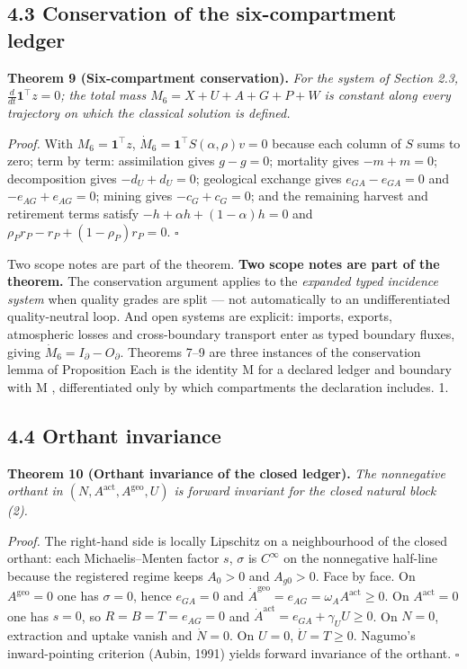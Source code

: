 \documentclass[11pt]{article}
\begin{document}
\subsection*{4.3 Conservation of the six-compartment ledger}\label{43-conservation-of-the-six-compartment-ledger}

\textbf{Theorem 9 (Six-compartment conservation).} \emph{For the system of Section 2.3, \(\frac{d}{dt}\mathbf{1}^\top z =\allowbreak{} 0\); the total mass \(M_6 = X + U + A + G + P + W\) is constant along every trajectory on which the classical solution is defined.}

\emph{Proof.} With \(M_6 = \mathbf{1}^\top z\), \(\dot M_6 =\allowbreak{} \mathbf{1}^\top S(\alpha,\allowbreak{}\rho) v =\allowbreak{} 0\) because each column of \(S\) sums to zero; term by term: assimilation gives \(g - g = 0\); mortality gives \(-m + m = 0\); decomposition gives \(-d_U + d_U = 0\); geological exchange gives \(e_{GA} - e_{GA} = 0\) and \(-e_{AG} + e_{AG} = 0\); mining gives \(-c_G + c_G = 0\); and the remaining harvest and retirement terms satisfy \(-h +\allowbreak{} \alpha h +\allowbreak{} (1-\alpha)h =\allowbreak{} 0\) and \(\rho_P r_P - r_P +\allowbreak{} (1-\rho_P)r_P =\allowbreak{} 0\). \(\square\)

Two scope notes are part of the theorem. \textbf{Two scope notes are part of the theorem.} The conservation argument applies to the \emph{expanded typed incidence system} when quality grades are split --- not automatically to an undifferentiated quality-neutral loop. And open systems are explicit: imports, exports, atmospheric losses and cross-boundary transport enter as typed boundary fluxes, giving \(\dot M_6=\allowbreak{}I_\partial-O_\partial\). Theorems 7--9 are three instances of the conservation lemma of Proposition Each is the identity M for a declared ledger and boundary with M , differentiated only by which compartments the declaration includes. 1.

\subsection*{4.4 Orthant invariance}\label{44-orthant-invariance}

\textbf{Theorem 10 (Orthant invariance of the closed ledger).} \emph{The nonnegative orthant in \((N,\allowbreak{} A^{\mathrm{act}},\allowbreak{} A^{\mathrm{geo}},\allowbreak{} U)\) is forward invariant for the closed natural block (2).}

\emph{Proof.} The right-hand side is locally Lipschitz on a neighbourhood of the closed orthant: each Michaelis--Menten factor \(s\), \(\sigma\) is \(C^\infty\) on the nonnegative half-line because the registered regime keeps \(A_0 > 0\) and \(A_{g0} > 0\). Face by face. On \(A^{\mathrm{geo}} = 0\) one has \(\sigma = 0\), hence \(e_{GA} = 0\) and \(\dot A^{\mathrm{geo}} =\allowbreak{} e_{AG} =\allowbreak{} \omega_A A^{\mathrm{act}} \ge 0\). On \(A^{\mathrm{act}} = 0\) one has \(s = 0\), so \(R = B = T = e_{AG} = 0\) and \(\dot A^{\mathrm{act}} =\allowbreak{} e_{GA} +\allowbreak{} \gamma_U U \ge 0\). On \(N = 0\), extraction and uptake vanish and \(\dot N = 0\). On \(U = 0\), \(\dot U = T \ge 0\). Nagumo's inward-pointing criterion (Aubin, 1991) yields forward invariance of the orthant. \(\square\)
\end{document}

